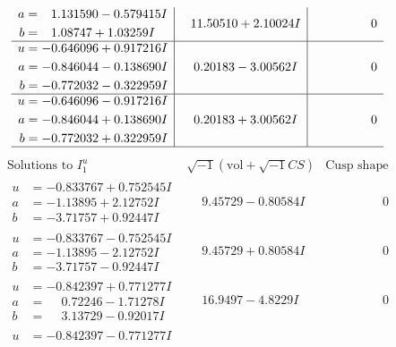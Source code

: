 \documentclass[1p]{elsarticle_modified}
\theoremstyle{definition}
\newcommand{\I}{\sqrt{-1}}
\begin{document}
$$\begin{array}{c|c|c}
\begin{aligned}
a &= \phantom{-}1.131590 - 0.579415 I \\
b &= \phantom{-}1.08747 + 1.03259 I\end{aligned}
 & \phantom{-}11.50510 + 2.10024 I & \phantom{-0.000000 } 0 \\ \hline\begin{aligned}
u &= -0.646096 + 0.917216 I \\
a &= -0.846044 - 0.138690 I \\
b &= -0.772032 - 0.322959 I\end{aligned}
 & \phantom{-}0.20183 - 3.00562 I & \phantom{-0.000000 } 0 \\ \hline\begin{aligned}
u &= -0.646096 - 0.917216 I \\
a &= -0.846044 + 0.138690 I \\
b &= -0.772032 + 0.322959 I\end{aligned}
 & \phantom{-}0.20183 + 3.00562 I & \phantom{-0.000000 } 0\\
 \hline 
 \end{array}$$\newpage$$\begin{array}{c|c|c}  
\text{Solutions to }I^u_{1}& \I (\text{vol} + \sqrt{-1}CS) & \text{Cusp shape}\\
 \hline 
\begin{aligned}
u &= -0.833767 + 0.752545 I \\
a &= -1.13895 + 2.12752 I \\
b &= -3.71757 + 0.92447 I\end{aligned}
 & \phantom{-}9.45729 - 0.80584 I & \phantom{-0.000000 } 0 \\ \hline\begin{aligned}
u &= -0.833767 - 0.752545 I \\
a &= -1.13895 - 2.12752 I \\
b &= -3.71757 - 0.92447 I\end{aligned}
 & \phantom{-}9.45729 + 0.80584 I & \phantom{-0.000000 } 0 \\ \hline\begin{aligned}
u &= -0.842397 + 0.771277 I \\
a &= \phantom{-}0.72246 - 1.71278 I \\
b &= \phantom{-}3.13729 - 0.92017 I\end{aligned}
 & \phantom{-}16.9497 - 4.8229 I & \phantom{-0.000000 } 0 \\ \hline\begin{aligned}
u &= -0.842397 - 0.771277 I \\

\end{aligned}
\end{array}$$
\end{document}
